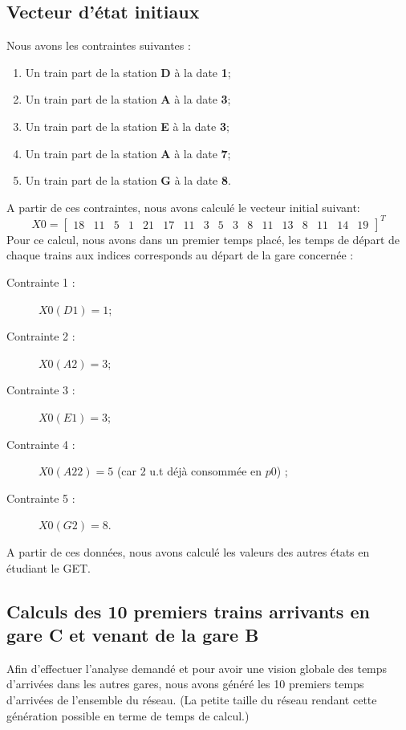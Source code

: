 \subsection{Vecteur d'état initiaux}
Nous avons les contraintes suivantes : 
\begin{enumerate}
\item Un train part de la station \textbf{D} à la date \textbf{1};%
\item Un train part de la station \textbf{A} à la date \textbf{3};%
\item Un train part de la station \textbf{E} à la date \textbf{3};%
\item Un train part de la station \textbf{A} à la date \textbf{7};%
\item Un train part de la station \textbf{G} à la date \textbf{8}.%
\end{enumerate}
A partir de ces contraintes, nous avons calculé le vecteur initial suivant: 
\begin{equation}
X0 = 
\left[
\begin{array}{ccccccccccccccccc}
18  &11  &5   &1   &21  &17  &11  &3   &5   &3   &8   &11  &13  &8   &11  &14  &19 
\end{array} \right]^T
\end{equation}
Pour ce calcul, nous avons dans un premier temps placé, les temps de départ de chaque trains aux indices corresponds au départ de la gare concernée : 
\begin{description}

\item[Contrainte 1 :] $X0(D1) = 1$; 
\item[Contrainte 2 :] $X0(A2) = 3$; 
\item[Contrainte 3 :] $X0(E1) = 3$; 
\item[Contrainte 4 :] $X0(A22) = 5$ (car 2 u.t déjà consommée en $p0$) ; 
\item[Contrainte 5 :] $X0(G2) = 8$. 
\end{description}
A partir de ces données, nous avons calculé les valeurs des autres états en étudiant le GET.


\subsection{Calculs des 10 premiers trains arrivants en gare C et venant de la gare B}
Afin d'effectuer l'analyse demandé et pour avoir une vision globale des temps d'arrivées dans les autres gares, nous avons généré les 10 premiers temps d'arrivées de l'ensemble du réseau. (La petite taille du réseau rendant cette génération possible en terme de temps de calcul.)

